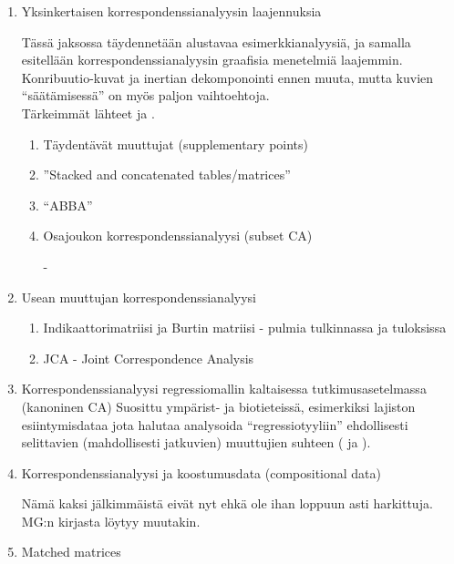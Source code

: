 \begin{enumerate}
\begin{enumerate}
\end{enumerate}

\item Yksinkertaisen korrespondenssianalyysin laajennuksia

 Tässä jaksossa täydennetään alustavaa esimerkkianalyysiä, ja samalla esitellään korrespondenssianalyysin graafisia menetelmiä laajemmin. Konribuutio-kuvat ja inertian dekomponointi ennen muuta, mutta kuvien ``säätämisessä'' on myös paljon vaihtoehtoja.\\
 
 Tärkeimmät lähteet \cite{RefWorks:79} ja \cite{RefWorks:55}.
 
\begin{enumerate} %

\item Täydentävät muuttujat (supplementary points)
\item ''Stacked and concatenated tables/matrices''
\item ``ABBA''
\item Osajoukon korrespondenssianalyysi (subset CA)

- 

\end{enumerate} %

\item Usean muuttujan korrespondenssianalyysi

\begin{enumerate} %
 
\item Indikaattorimatriisi ja Burtin matriisi
 - pulmia tulkinnassa ja tuloksissa
\item JCA - Joint Correspondence Analysis

\end{enumerate} %
 
\item Korrespondenssianalyysi regressiomallin kaltaisessa tutkimusasetelmassa (kanoninen CA) 
 Suosittu ympärist- ja biotieteissä, esimerkiksi lajiston esiintymisdataa jota halutaa analysoida ``regressiotyyliin'' ehdollisesti selittavien (mahdollisesti jatkuvien) muuttujien  suhteen (\cite{RefWorks:78} ja \cite{RefWorks:55}).
 
\item Korrespondenssianalyysi ja koostumusdata (compositional data)

 Nämä kaksi jälkimmäistä eivät nyt ehkä ole ihan loppuun asti harkittuja. MG:n kirjasta löytyy muutakin.
 
\item Matched matrices


\end{enumerate}
